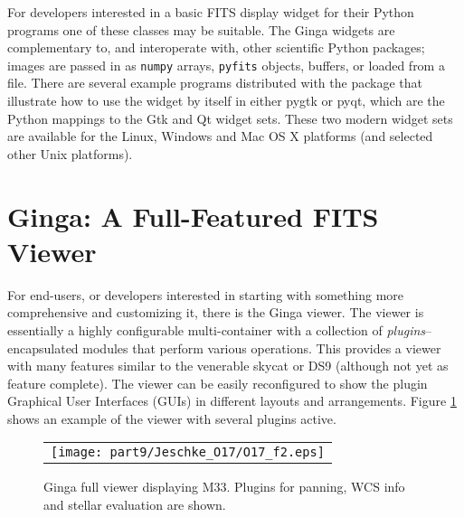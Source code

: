 For developers interested in a basic FITS display widget for their Python programs one of these classes may be suitable. The Ginga widgets are complementary to, and interoperate with, other scientific Python packages; images are passed in as {\tt {}numpy} arrays, {\tt {}pyfits} objects, buffers, or loaded from a file. There are several example programs distributed with the package that illustrate how to use the widget by itself in either pygtk or pyqt, which are the Python mappings to the Gtk and Qt widget sets. These two modern widget sets are available for the Linux, Windows and Mac OS X platforms (and selected other Unix platforms).

\section{Ginga: A Full-Featured FITS Viewer}
For end-users, or developers interested in starting with something more comprehensive and customizing it, there is the Ginga viewer.  The viewer is essentially a highly configurable multi-container with a collection of \emph{plugins}--encapsulated modules that perform various operations. This provides a viewer with many features similar to the venerable skycat \citep{skycat} or DS9 (although not yet as feature complete). The viewer can be easily reconfigured to show the plugin Graphical User Interfaces (GUIs) in different layouts and arrangements. Figure \ref{fig:ginga} shows an example of the viewer with several plugins active. 
\begin{figure}
  \begin{center}
    \begin{tabular}{c}
      \texttt{[image: part9/Jeschke\_O17/O17\_f2.eps]}
    \end{tabular}
  \end{center}
  \caption[example] 
          { \label{fig:ginga} 
            Ginga full viewer displaying M33. Plugins for panning, WCS info and stellar evaluation are shown.} 
\end{figure} 

